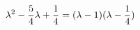 \documentclass[preview]{standalone}
\begin{document}
\begin{align*}
\special{dvisvgm:raw <g id='unique000'>}\lambda^2-\frac54\lambda+\frac14=(\lambda-1)(\lambda-\frac14)\special{dvisvgm:raw </g>}
\end{align*}
\end{document}
